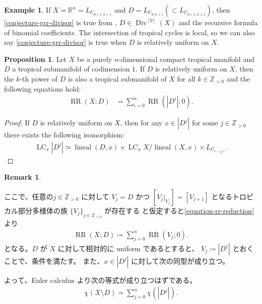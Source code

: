 \documentclass[a4paper,dvipdfmx,reqno,12pt]{amsart}
\theoremstyle{definition}
\newtheorem{example}[theorem]{Example}
\newtheorem{proposition}[theorem]{Proposition}
\newtheorem{remark}[theorem]{Remark}
\newcommand{\deq}{\coloneqq}
\newcommand{\opn}[1]{\operatorname{#1}}
\numberwithin{equation}{section}
\begin{document}
\begin{example}
If $X=\mathbb{R}^{n}=L_{U_{d+1,n+1}}$ and 
$D= L_{U_{d,n+1}}(\subset L_{U_{d+1,n+1}})$,
then \cref{conjecture-grr-divisor} is true
from \cite[Example 2.10]{MR3999674},
$D\in \opn{Div}^{[0]}(X)$ and
the recursive formula of binomial coefficients.
The intersection of tropical cycles
is local, so we can also say
\cref{conjecture-grr-divisor} is true
when $D$ is relatively uniform on $X$.
\end{example}


\begin{proposition}
Let $X$ be a purely $n$-dimensional
compact tropical manifold
and $D$ a tropical submanifold of codimension $1$.
If $D$ is relatively uniform on $X$, then 
the $k$-th power of $D$ is also a tropical submanifold
of $X$ for all $k \in \mathbb{Z}_{>0}$ and the following
equations hold:
\begin{align}
\opn{RR}(X;D)&=\sum_{i=0}^{n}\opn{RR}(|D^{i}|;0).
\end{align}
\end{proposition}
\begin{proof}
If $D$ is relatively uniform on $X$,
then for any $x\in |D^{j}|$ for some $j\in \mathbb{Z}_{>0}$
there exists the following isomorphism:
\begin{align}
\label{equation-relatively-uniform-cone}
\opn{LC}_x |D^{j}|\simeq 
\opn{lineal}(D,x)\times \opn{LC}_x X/\opn{lineal}(X,x)
\times L_{U_{r-j,r}}.
\end{align}



\end{proof}

\begin{remark}
\label{remark-rr-in-ag}


ここで、任意の$j\in \mathbb{Z}_{>0}$ に対して
$V_j=D$ かつ
$[V_{j}|_{V_{j}}]=[V_{j+1}]$ となるトロピカル部分多様体の族
$\{V_j\}_{j\in \mathbb{Z}_{>0}}$ が存在する
と仮定すると\eqref{equation-rr-reduction} より
\begin{align}
\opn{RR}(X;D)\deq \sum_{j=0}^{n}\opn{RR}(V_j;0).
\end{align}
となる。$D$ が $X$ に対して相対的に uniform であるとすると、
$V_j\deq |D^{j}|$ とおくことで、条件を満たす。 
また、$x\in |D^j|$ に対して次の同型が成り立つ。

よって、Euler calculus より次の等式が成り立つはずである。
\begin{align}
\label{equation-euler-calculus-sum}
\chi(X\setminus D)=\sum_{j=0}^{n}\chi(|D^{j}|).
\end{align}

\end{remark}



\end{document}
